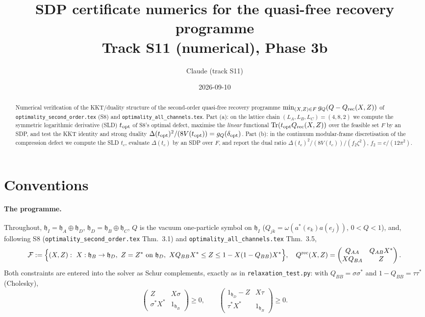 \documentclass[11pt]{article}
\title{SDP certificate numerics for the quasi-free recovery programme\\
{\large Track S11 (numerical), Phase 3b}}
\author{Claude (track S11)}
\date{2026-09-10}
\newcommand{\hh}{\mathfrak h}
\begin{document}
\maketitle

\begin{abstract}
Numerical verification of the KKT/duality structure of the second-order quasi-free
recovery programme
$\min_{(X,Z)\in F} g_Q(Q-Q_{\rm rec}(X,Z))$
of \texttt{optimality\_second\_order.tex} (S8) and \texttt{optimality\_all\_channels.tex}.
Part (a): on the lattice chain $(L_A,L_B,L_C)=(4,8,2)$ we compute the symmetric
logarithmic derivative (SLD) $t_{\rm opt}$ of S8's optimal defect, maximise the
\emph{linear} functional $\operatorname{Tr}(t_{\rm opt}Q_{\rm rec}(X,Z))$ over the feasible set $F$
by an SDP, and test the KKT identity and strong duality
$\Delta(t_{\rm opt})^2/(8V(t_{\rm opt}))=g_Q(\delta_{\rm opt})$.
Part (b): in the continuum modular-frame discretisation of the compression defect we
compute the SLD $t_c$, evaluate $\Delta(t_c)$ by an SDP over $F$, and report the
dual ratio $\Delta(t_c)^2/(8V(t_c))\big/(f_2\zeta^2)$, $f_2=c/(12\pi^2)$.
\end{abstract}


\section{Conventions}
\label{sec:conv}

\paragraph{The programme.}  Throughout, $\hh_I=\hh_A\oplus\hh_D$, $\hh_D=\hh_B\oplus\hh_C$,
$Q$ is the vacuum one-particle symbol on $\hh_I$ ($Q_{jk}=\omega(a^*(e_k)a(e_j))$, $0<Q<1$),
and, following S8 (\texttt{optimality\_second\_order.tex} Thm.~3.1) and
\texttt{optimality\_all\_channels.tex} Thm.~3.5,
\begin{equation}\label{eq:F}
 \mathcal F:=\Bigl\{(X,Z):\ X:\hh_B\to\hh_D,\ Z=Z^*\ \text{on}\ \hh_D,\
   XQ_{BB}X^*\le Z\le 1-X(1-Q_{BB})X^*\Bigr\},\quad
 Q^{\rm rec}(X,Z)=\begin{pmatrix}Q_{AA}&Q_{AB}X^*\\ XQ_{BA}&Z\end{pmatrix}.
\end{equation}
Both constraints are entered into the solver as Schur complements, exactly as in
\texttt{relaxation\_test.py}: with $Q_{BB}=\sigma\sigma^*$ and $1-Q_{BB}=\tau\tau^*$
(Cholesky),
\begin{equation}\label{eq:schur}
 \begin{pmatrix}Z&X\sigma\\ \sigma^*X^*&1_{\hh_B}\end{pmatrix}\ge0,
 \qquad
 \begin{pmatrix}1_{\hh_D}-Z&X\tau\\ \tau^*X^*&1_{\hh_B}\end{pmatrix}\ge0 .
\end{equation}
\end{document}
